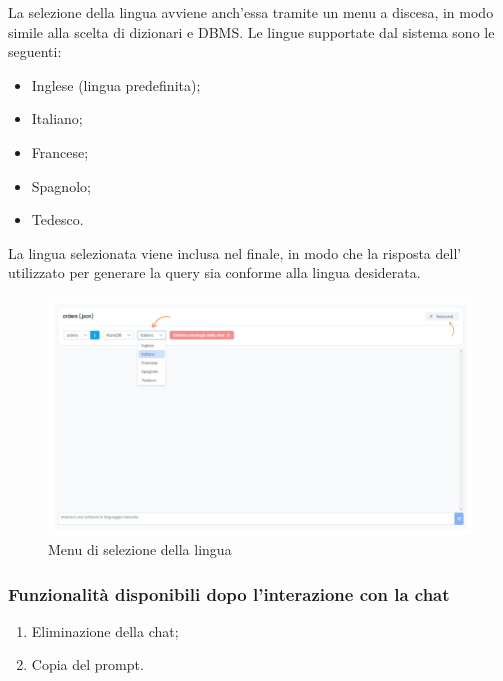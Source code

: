  \label{sec:lingua-chat}

\par La selezione della lingua avviene anch'essa tramite un menu a discesa, in modo simile alla scelta di dizionari e DBMS. Le lingue supportate dal sistema sono le seguenti:
\begin{itemize}
  \item Inglese (lingua predefinita);
  \item Italiano;
  \item Francese;
  \item Spagnolo;
  \item Tedesco.
\end{itemize}

\vspace{0.5\baselineskip}
\par La lingua selezionata viene inclusa nel  finale, in modo che la risposta dell' utilizzato per generare la query  sia conforme alla lingua desiderata.

\begin{figure}[H]
  \centering
  \includegraphics[width=1\textwidth]{assets/cambio_lingua.png}
  \caption{Menu di selezione della lingua}
\end{figure}

\subsubsection{Funzionalità disponibili dopo l'interazione con la chat}

\begin{enumerate}
  \item Eliminazione della chat;
  \item Copia del prompt.
\end{enumerate}

